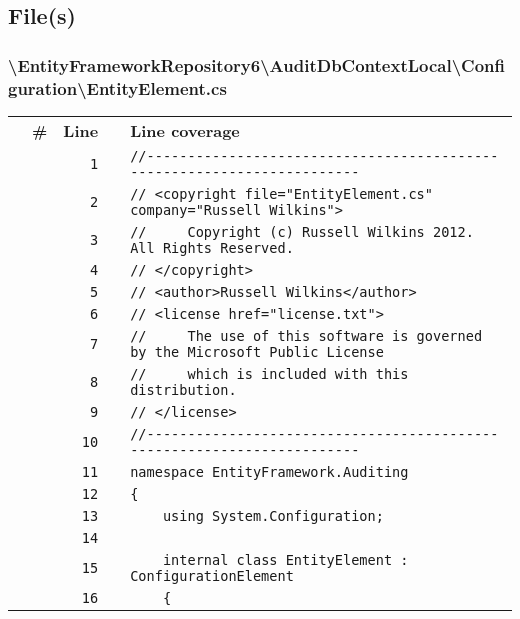 \documentclass[a4paper,10pt]{article}
\begin{document}
\subsection{File(s)}
\subsubsection{\textbackslash EntityFrameworkRepository6\textbackslash AuditDbContextLocal\textbackslash Configuration\textbackslash EntityElement.cs}
\begin{longtable}[l]{lrrll}
\textbf{} & \textbf{\#} & \textbf{Line} & \textbf{} & \textbf{Line coverage}\\
\cellcolor{gray} &  & \verb~1~ & & \verb~//-----------------------------------------------------------------------~\\
\cellcolor{gray} &  & \verb~2~ & & \verb~// <copyright file="EntityElement.cs" company="Russell Wilkins">~\\
\cellcolor{gray} &  & \verb~3~ & & \verb~//     Copyright (c) Russell Wilkins 2012. All Rights Reserved.~\\
\cellcolor{gray} &  & \verb~4~ & & \verb~// </copyright>~\\
\cellcolor{gray} &  & \verb~5~ & & \verb~// <author>Russell Wilkins</author>~\\
\cellcolor{gray} &  & \verb~6~ & & \verb~// <license href="license.txt">~\\
\cellcolor{gray} &  & \verb~7~ & & \verb~//     The use of this software is governed by the Microsoft Public License~\\
\cellcolor{gray} &  & \verb~8~ & & \verb~//     which is included with this distribution.~\\
\cellcolor{gray} &  & \verb~9~ & & \verb~// </license>~\\
\cellcolor{gray} &  & \verb~10~ & & \verb~//-----------------------------------------------------------------------~\\
\cellcolor{gray} &  & \verb~11~ & & \verb~namespace EntityFramework.Auditing~\\
\cellcolor{gray} &  & \verb~12~ & & \verb~{~\\
\cellcolor{gray} &  & \verb~13~ & & \verb~    using System.Configuration;~\\
\cellcolor{gray} &  & \verb~14~ & & \verb~~\\
\cellcolor{gray} &  & \verb~15~ & & \verb~    internal class EntityElement : ConfigurationElement~\\
\cellcolor{gray} &  & \verb~16~ & & \verb~    {~\\

\end{longtable}
\end{document}
